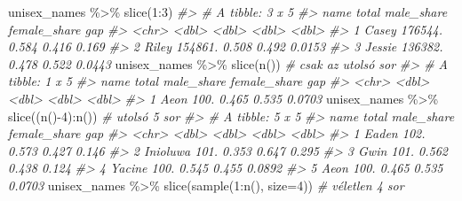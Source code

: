 \documentclass[
]{book}
\newenvironment{Shaded}{\begin{snugshade}}{\end{snugshade}}
\newcommand{\AttributeTok}[1]{\textcolor[rgb]{0.77,0.63,0.00}{#1}}
\newcommand{\CommentTok}[1]{\textcolor[rgb]{0.56,0.35,0.01}{\textit{#1}}}
\newcommand{\DecValTok}[1]{\textcolor[rgb]{0.00,0.00,0.81}{#1}}
\newcommand{\FunctionTok}[1]{\textcolor[rgb]{0.00,0.00,0.00}{#1}}
\newcommand{\NormalTok}[1]{#1}
\newcommand{\SpecialCharTok}[1]{\textcolor[rgb]{0.00,0.00,0.00}{#1}}
\begin{document}
\begin{Shaded}
\begin{Highlighting}[]
\NormalTok{unisex\_names }\SpecialCharTok{\%\textgreater{}\%} \FunctionTok{slice}\NormalTok{(}\DecValTok{1}\SpecialCharTok{:}\DecValTok{3}\NormalTok{)  }
\CommentTok{\#\textgreater{} \# A tibble: 3 x 5}
\CommentTok{\#\textgreater{}   name     total male\_share female\_share    gap}
\CommentTok{\#\textgreater{}   \textless{}chr\textgreater{}    \textless{}dbl\textgreater{}      \textless{}dbl\textgreater{}        \textless{}dbl\textgreater{}  \textless{}dbl\textgreater{}}
\CommentTok{\#\textgreater{} 1 Casey  176544.      0.584        0.416 0.169 }
\CommentTok{\#\textgreater{} 2 Riley  154861.      0.508        0.492 0.0153}
\CommentTok{\#\textgreater{} 3 Jessie 136382.      0.478        0.522 0.0443}
\NormalTok{unisex\_names }\SpecialCharTok{\%\textgreater{}\%} \FunctionTok{slice}\NormalTok{(}\FunctionTok{n}\NormalTok{())         }\CommentTok{\# csak az utolsó sor }
\CommentTok{\#\textgreater{} \# A tibble: 1 x 5}
\CommentTok{\#\textgreater{}   name  total male\_share female\_share    gap}
\CommentTok{\#\textgreater{}   \textless{}chr\textgreater{} \textless{}dbl\textgreater{}      \textless{}dbl\textgreater{}        \textless{}dbl\textgreater{}  \textless{}dbl\textgreater{}}
\CommentTok{\#\textgreater{} 1 Aeon   100.      0.465        0.535 0.0703}
\NormalTok{unisex\_names }\SpecialCharTok{\%\textgreater{}\%} \FunctionTok{slice}\NormalTok{((}\FunctionTok{n}\NormalTok{()}\SpecialCharTok{{-}}\DecValTok{4}\NormalTok{)}\SpecialCharTok{:}\FunctionTok{n}\NormalTok{()) }\CommentTok{\# utolsó 5 sor}
\CommentTok{\#\textgreater{} \# A tibble: 5 x 5}
\CommentTok{\#\textgreater{}   name     total male\_share female\_share    gap}
\CommentTok{\#\textgreater{}   \textless{}chr\textgreater{}    \textless{}dbl\textgreater{}      \textless{}dbl\textgreater{}        \textless{}dbl\textgreater{}  \textless{}dbl\textgreater{}}
\CommentTok{\#\textgreater{} 1 Eaden     102.      0.573        0.427 0.146 }
\CommentTok{\#\textgreater{} 2 Inioluwa  101.      0.353        0.647 0.295 }
\CommentTok{\#\textgreater{} 3 Gwin      101.      0.562        0.438 0.124 }
\CommentTok{\#\textgreater{} 4 Yacine    100.      0.545        0.455 0.0892}
\CommentTok{\#\textgreater{} 5 Aeon      100.      0.465        0.535 0.0703}
\NormalTok{unisex\_names }\SpecialCharTok{\%\textgreater{}\%} \FunctionTok{slice}\NormalTok{(}\FunctionTok{sample}\NormalTok{(}\DecValTok{1}\SpecialCharTok{:}\FunctionTok{n}\NormalTok{(), }\AttributeTok{size=}\DecValTok{4}\NormalTok{)) }\CommentTok{\# véletlen 4 sor}

\end{Highlighting}
\end{Shaded}
\end{document}
